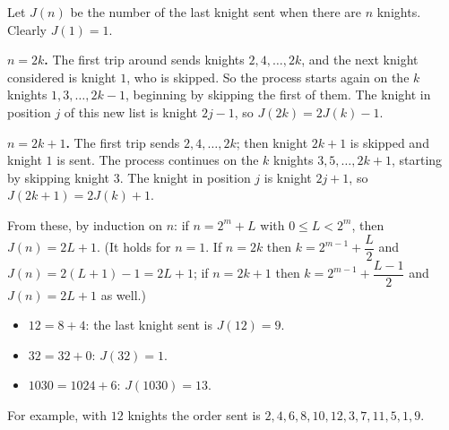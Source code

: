 Let $J(n)$ be the number of the last knight sent when there are $n$ knights. Clearly $J(1)=1$.

\textbf{$n=2k$.} The first trip around sends knights $2,4,\dots,2k$, and the next knight considered is knight $1$, who is skipped. So the process starts again on the $k$ knights $1,3,\dots,2k-1$, beginning by skipping the first of them. The knight in position $j$ of this new list is knight $2j-1$, so $J(2k)=2J(k)-1$.

\textbf{$n=2k+1$.} The first trip sends $2,4,\dots,2k$; then knight $2k+1$ is skipped and knight $1$ is sent. The process continues on the $k$ knights $3,5,\dots,2k+1$, starting by skipping knight $3$. The knight in position $j$ is knight $2j+1$, so $J(2k+1)=2J(k)+1$.

From these, by induction on $n$: if $n=2^m+L$ with $0\le L<2^m$, then $J(n)=2L+1$. (It holds for $n=1$. If $n=2k$ then $k=2^{m-1}+\dfrac{L}{2}$ and $J(n)=2\left(L+1\right)-1=2L+1$; if $n=2k+1$ then $k=2^{m-1}+\dfrac{L-1}{2}$ and $J(n)=2L+1$ as well.)

\begin{itemize}
\item $12=8+4$: the last knight sent is $J(12)=\boxed{9}$.
\item $32=32+0$: $J(32)=\boxed{1}$.
\item $1030=1024+6$: $J(1030)=\boxed{13}$.
\end{itemize}
For example, with $12$ knights the order sent is $2,4,6,8,10,12,3,7,11,5,1,9$.
